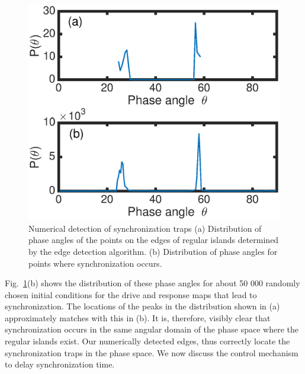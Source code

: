 \documentclass[reprint,superscriptaddress,amsmath,amssymb,aps,pre]{revtex4-1}
\begin{document}
\begin{figure}[h]
	\includegraphics[scale=0.45]{Edge_Sync_angles}
	\caption{\label{fig:Edge_Sync_angles} \footnotesize Numerical detection of 
		synchronization traps (a) Distribution of phase 
		angles of the points on the edges of regular islands determined by the edge 
		detection algorithm. (b) Distribution of phase angles for points where 
		synchronization occurs. }
\end{figure}

Fig.~\ref{fig:Edge_Sync_angles}(b) shows the distribution of these phase angles for about 50 000 randomly chosen initial conditions for the drive and response maps that lead to synchronization. The locations of the peaks in the distribution shown in (a) approximately matches with this in (b). It is, therefore, visibly clear that synchronization occurs in the same angular domain of the phase space where the regular islands exist. Our numerically detected edges, thus correctly locate the synchronization traps in the phase space.  We now discuss the control mechanism to delay synchronization time. 
\end{document}
